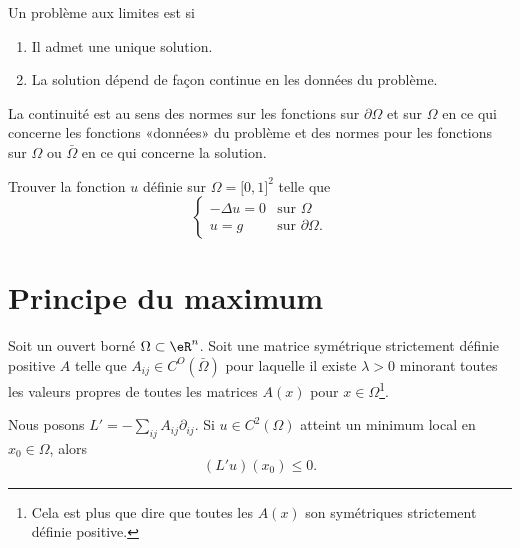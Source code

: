 \begin{definition}      \label{DEFooSNIRooBFYSFh}
	Un problème aux limites est  si
	\begin{enumerate}
		\item
		      Il admet une unique solution.
		\item
		      La solution dépend de façon continue en les données du problème.
	\end{enumerate}
	La continuité est au sens des normes sur les fonctions sur \( \partial\Omega\) et sur \( \Omega\) en ce qui concerne les fonctions «données» du problème et des normes pour les fonctions sur \( \Omega\) ou \( \bar\Omega\) en ce qui concerne la solution.
\end{definition}

\begin{example}
	Trouver la fonction \( u\) définie sur \( \Omega= \mathopen[ 0 , 1 \mathclose]^2\) telle que
	\begin{equation}
		\begin{cases}
			-\Delta u=0 & \text{sur } \Omega          \\
			u=g         & \text{sur }\partial \Omega.
		\end{cases}
	\end{equation}

\end{example}

\section{Principe du maximum}

\begin{lemma}        \label{LEMooSPVUooDQOeom}
	Soit un ouvert borné \( \Omega\subset \eR^n\). Soit une matrice symétrique strictement définie positive \( A\) telle que \( A_{ij}\in C^O(\bar \Omega)\) pour laquelle il existe \( \lambda>0\) minorant toutes les valeurs propres de toutes les matrices \( A(x)\) pour \( x\in \Omega\)\footnote{Cela est plus que dire que toutes les \( A(x)\) son symétriques strictement définie positive.}.

	Nous posons \( L'=-\sum_{ij}A_{ij}\partial_{ij}\). Si \( u\in C^2(\Omega)\) atteint un minimum local en \( x_0\in \Omega\), alors
	\begin{equation}
		(L'u)(x_0)\leq 0.
	\end{equation}
\end{lemma}

